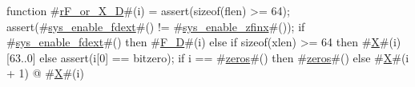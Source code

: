 function #\hyperref[sailRISCVzrFzyorzyXzyD]{rF\_or\_X\_D}#(i) = {
  assert(sizeof(flen) >= 64);
  assert(#\hyperref[sailRISCVzsyszyenablezyfdext]{sys\_enable\_fdext}#() != #\hyperref[sailRISCVzsyszyenablezyzzfinx]{sys\_enable\_zfinx}#());
  if   #\hyperref[sailRISCVzsyszyenablezyfdext]{sys\_enable\_fdext}#()
  then #\hyperref[sailRISCVzFzyD]{F\_D}#(i)
  else if sizeof(xlen) >= 64
  then #\hyperref[sailRISCVzX]{X}#(i)[63..0]
  else {
    assert(i[0] == bitzero);
    if i == #\hyperref[sailRISCVzzzeros]{zeros}#() then #\hyperref[sailRISCVzzzeros]{zeros}#() else #\hyperref[sailRISCVzX]{X}#(i + 1) @ #\hyperref[sailRISCVzX]{X}#(i)
  }
}
